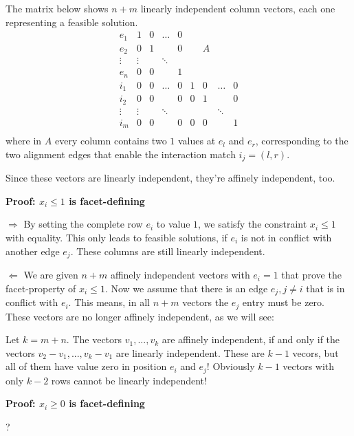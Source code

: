 \documentclass[a4paper, oneside]{scrartcl}
\begin{document}
The matrix below shows $n+m$ linearly independent column vectors, each one representing a feasible solution.
\[
\begin{array}{c|cccc|cccc}
e_1    & 1       & 0 & \hdots & 0      &   &   &        &   \\
e_2    & 0       & 1 &        & 0      &   & A &        &   \\
\vdots & \vdots  &   & \ddots &        &   &   &        &   \\
e_n    & 0       & 0 &        & 1      &   &   &        &   \\ 
\hline
i_1    & 0       & 0 & \hdots & 0      & 1 & 0 & \hdots & 0 \\
i_2    & 0       & 0 &        & 0      & 0 & 1 &        & 0 \\
\vdots & \vdots  &   & \ddots &        &   &   & \ddots &   \\
i_m    & 0       & 0 &        & 0      & 0 & 0 &        & 1 \\
\end{array}
\]
where in $A$ every column contains two $1$ values at $e_l$ and $e_r$, 
corresponding to the two alignment edges that enable the interaction match $i_j = (l,r)$.

Since these vectors are linearly independent, they're affinely independent, too.

\vspace{5mm} \noindent \textbf{Proof: $x_i \leq 1$ is facet-defining}

$\Rightarrow$ By setting the complete row $e_i$ to value $1$, we satisfy the constraint $x_i \leq 1$ with equality.
This only leads to feasible solutions, if $e_i$ is not in conflict with another edge $e_j$. 
These columns are still linearly independent.

$\Leftarrow$ We are given $n+m$ affinely independent vectors with $e_i=1$ that prove the facet-property of $x_i \leq 1$.
Now we assume that there is an edge $e_j, j\neq i$ that is in conflict with $e_i$. This means, in all $n+m$ 
vectors the $e_j$ entry must be zero. These vectors are no longer affinely independent, as we will see:

Let $k = m+n$. The vectors $v_1, ..., v_k$ are affinely independent, if and only if the vectors 
$v_2-v_1, ..., v_k-v_1$ are linearly independent. These are $k-1$ vecors, but all of them have value zero in position $e_i$ and $e_j$!
Obviously $k-1$ vectors with only $k-2$ rows cannot be linearly independent!

\vspace{5mm} \noindent \textbf{Proof: $x_i \geq 0$ is facet-defining}

?
\end{document}

